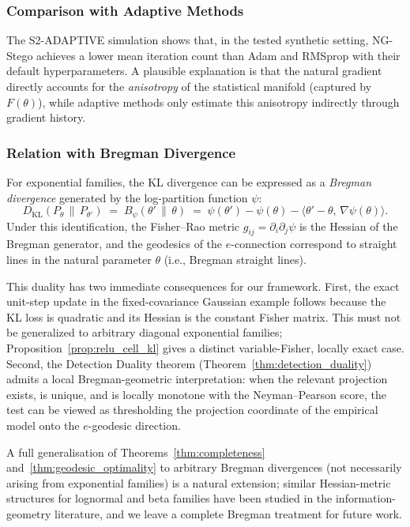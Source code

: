 \documentclass[a4paper,fleqn]{cas-dc}
\newcommand{\DKL}{D_{\mathrm{KL}}}
\begin{document}
\subsubsection{Comparison with Adaptive Methods}

The S2-ADAPTIVE simulation shows that,
in the tested synthetic setting, NG-Stego achieves a lower mean iteration
count than Adam and RMSprop with their default hyperparameters. A plausible explanation is that the natural gradient directly accounts for
the \emph{anisotropy} of the statistical manifold (captured by $F(\theta)$), while adaptive methods only estimate this anisotropy indirectly through gradient history.

\subsubsection{Relation with Bregman Divergence}
\label{subsec:bregman}

For exponential families, the KL divergence can be expressed as a
\emph{Bregman divergence} generated by the log-partition function $\psi$:
\begin{equation}
  \DKL(P_\theta \,\|\, P_{\theta'})
  \;=\;
  B_\psi(\theta' \,\|\, \theta)
  \;=\;
  \psi(\theta') - \psi(\theta)
  - \langle\theta' - \theta,\, \nabla\psi(\theta)\rangle.
  \label{eq:bregman_kl}
\end{equation}
Under this identification, the Fisher--Rao metric $g_{ij}=\partial_i\partial_j\psi$
is the Hessian of the Bregman generator, and the geodesics of the
$e$-connection correspond to straight lines in the natural parameter
$\theta$ (i.e., Bregman straight lines).

This duality has two immediate consequences for our framework.
First, the exact unit-step update in the fixed-covariance Gaussian
example follows because the KL loss is quadratic and its Hessian is the
constant Fisher matrix. This must not be generalized to arbitrary
diagonal exponential families; Proposition~\ref{prop:relu_cell_kl}
gives a distinct variable-Fisher, locally exact case.
Second, the Detection Duality theorem
(Theorem~\ref{thm:detection_duality}) admits a local Bregman-geometric
interpretation: when the relevant projection exists, is unique, and is
locally monotone with the Neyman--Pearson score, the test can be viewed as
thresholding the projection coordinate of the empirical model onto the
$e$-geodesic direction.

A full generalisation of Theorems~\ref{thm:completeness}
and~\ref{thm:geodesic_optimality} to arbitrary Bregman divergences
(not necessarily arising from exponential families) is a natural
extension; similar Hessian-metric structures for lognormal and beta
families have been studied in the information-geometry literature, and
we leave a complete Bregman treatment for future work.
\end{document}
